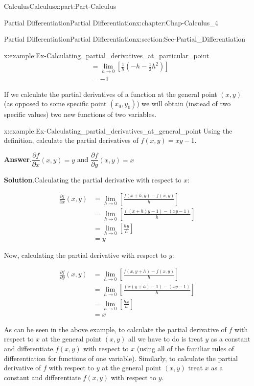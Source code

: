\documentclass[oneside,10pt,]{book}
\newcommand{\blocktitlefont}{\relax}
\numberwithin{equation}{section}
\newcommand{\amp}{&}
\begin{document}
\begin{partptx}{Calculus}{}{Calculus}{}{}{x:part:Part-Calculus}
\begin{chapterptx}{Partial Differentiation}{}{Partial Differentiation}{}{}{x:chapter:Chap-Calculus_4}
\begin{sectionptx}{Partial Differentiation}{}{Partial Differentiation}{}{}{x:section:Sec-Partial_Differentiation}
\begin{example}{}{x:example:Ex-Calculating_partial_derivatives_at_particular_point}
\begin{align*}
\amp = \lim_{h \to 0} \left[ \frac{1}{h} \left(-h-\frac{1}{2}h^2 \right) \right]\\
\amp = -1
\end{align*}
%
\end{example}
If we calculate the partial derivatives of a function at the general point \((x,y)\) (as opposed to some specific point \((x_0,y_0)\)) we will obtain (instead of two specific values) two new functions of two variables.%
\begin{example}{}{x:example:Ex-Calculating_partial_derivatives_at_general_point}%
Using the definition, calculate the partial derivatives of \(f(x,y) = xy-1\).%
\par\smallskip%
\noindent\textbf{\blocktitlefont Answer}.\hypertarget{g:answer:id545950}{}\quad{}\(\dfrac{\partial f}{\partial x}(x,y) = y\) and \(\dfrac{\partial f}{\partial y}(x,y) = x\)%
\par\smallskip%
\noindent\textbf{\blocktitlefont Solution}.\hypertarget{g:solution:id545963}{}\quad{}Calculating the partial derivative with respect to \(x\):%
\par
%
\begin{align*}
\frac{\partial f}{\partial x}(x,y) \amp = \lim_{h \to 0} \left[ \frac{f(x+h,y)-f(x,y)}{h} \right]\\
\amp = \lim_{h \to 0} \left[ \frac{\left( (x+h)y-1 \right)-(xy-1)}{h} \right]\\
\amp = \lim_{h \to 0} \left[ \frac{hy}{h} \right]\\
\amp = y
\end{align*}
%
\par
Now, calculating the partial derivative with respect to \(y\):%
\par
%
\begin{align*}
\frac{\partial f}{\partial y}(x,y) \amp = \lim_{h \to 0} \left[ \frac{f(x,y+h)-f(x,y)}{h} \right]\\
\amp = \lim_{h \to 0} \left[ \frac{\left( x(y+h)-1 \right)-(xy-1)}{h} \right]\\
\amp = \lim_{h \to 0} \left[ \frac{hx}{h} \right]\\
\amp = x
\end{align*}
%
\end{example}
As can be seen in the above example, to calculate the partial derivative of \(f\) with respect to \(x\) at the general point \((x,y)\) all we have to do is treat \(y\) as a constant and differentiate \(f(x,y)\) with respect to \(x\) (using all of the familiar rules of differentiation for functions of one variable). Similarly, to calculate the partial derivative of \(f\) with respect to \(y\) at the general point \((x,y)\) treat \(x\) as a constant and differentiate \(f(x,y)\) with respect to \(y\).%

\end{sectionptx}
\end{chapterptx}
\end{partptx}
\end{document}
